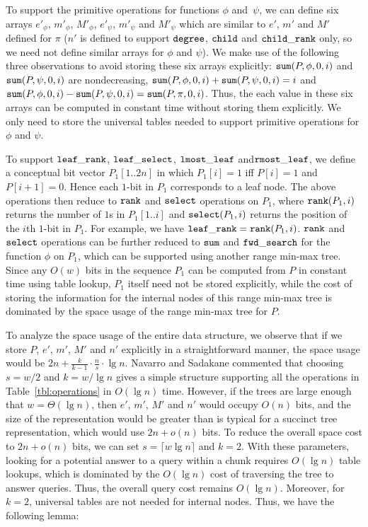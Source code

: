 To support the primitive operations for functions $\phi$ and~$\psi$, we can
define six arrays $e'_{\phi}$, $m'_{\phi}$, $M'_{\phi}$, $e'_{\psi}$,
$m'_{\psi}$ and $M'_{\psi}$ which are similar to $e'$, $m'$ and $M'$ defined for
$\pi$ ($n'$ is defined to support $\mathtt{degree}$, $\mathtt{child}$ and $\mathtt{child\_rank}$ only, so
we need not define similar arrays for $\phi$ and $\psi$).
We make use of the following three observations to avoid storing these six
arrays explicitly: $\mathtt{sum}(P, \phi, 0, i)$ and $\mathtt{sum}(P, \psi, 0, i)$ are
nondecreasing, $\mathtt{sum}(P, \phi, 0, i) + \mathtt{sum}(P, \psi, 0, i) = i$ and
$\mathtt{sum}(P, \phi, 0, i) - \mathtt{sum}(P, \psi, 0, i) = \mathtt{sum}(P, \pi, 0, i)$.
Thus, the each value in these six arrays can be computed in constant time
without storing them explicitly.
We only need to store the universal tables needed to support primitive
operations for $\phi$ and $\psi$.

To support $\mathtt{leaf\_rank}$, $\mathtt{leaf\_select}$, $\mathtt{lmost\_leaf}$ and\break $\mathtt{rmost\_leaf}$, we
define a conceptual bit vector $P_1[1..2n]$ in which $P_1[i] = 1$ iff $P[i] = 1$
and $P[i+1] = 0$.
Hence each $1$-bit in $P_1$ corresponds to a leaf node.
The above operations then reduce to $\mathtt{rank}$ and $\mathtt{select}$ operations on
$P_1$, where $\mathtt{rank}(P_1, i)$ returns the number of $1$s in $P_1[1..i]$ and
$\mathtt{select}(P_1, i)$ returns the position of the $i$th $1$-bit in $P_1$.
For example, we have $\mathtt{leaf\_rank} = \mathtt{rank}(P_1, i)$.
$\mathtt{rank}$ and $\mathtt{select}$ operations can be further reduced to $\mathtt{sum}$ and
$\mathtt{fwd\_search}$ for the function $\phi$ on $P_1$, which can be supported using
another range min-max tree.
Since any $O(w)$ bits in the sequence $P_1$ can be computed from $P$ in constant
time using table lookup, $P_1$ itself need not be stored explicitly, while the
cost of storing the information for the internal nodes of this range min-max
tree is dominated by the space usage of the range min-max tree for $P$.

To analyze the space usage of the entire data structure, we observe that if we
store $P$, $e'$, $m'$, $M'$ and $n'$ explicitly in a straightforward manner, the
space usage  would be $2n + \frac{k}{k-1} \cdot \frac{n}{s} \cdot \lg n$.
Navarro and Sadakane commented that choosing $s = w/2$ and $k = w / \lg n$ gives
a simple structure supporting all the operations in Table~\ref{tbl:operations}
in $O(\lg n)$ time.
However, if the trees are large enough that $w = \Theta(\lg n)$, then $e'$,
$m'$, $M'$ and $n'$ would occupy $O(n)$ bits, and the size of the representation
would be greater than is typical for a succinct tree representation,
which would use $2n+o(n)$ bits.
To reduce the overall space cost to $2n+o(n)$ bits, we can set
$s = \lceil w\lg n\rceil$ and $k = 2$.
With these parameters, looking for a potential answer to a query within a chunk
requires $O(\lg n)$ table lookups, which is dominated by the $O(\lg n)$ cost of
traversing the tree to answer queries.
Thus, the overall query cost remains $O(\lg n)$.
Moreover, for $k = 2$, universal tables are not needed for internal nodes.
Thus, we have the following lemma:

